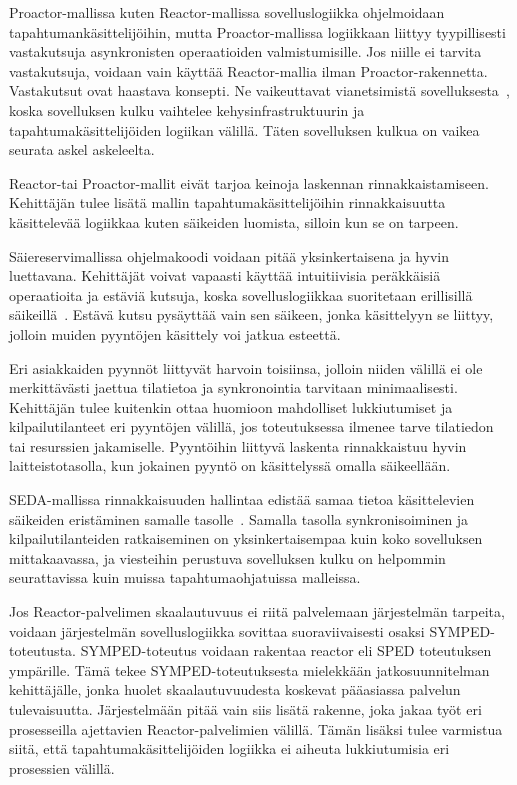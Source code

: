 \documentclass[finnish]{tktltiki2}%
\theoremstyle{definition}
\theoremstyle{remark}
\begin{document}
Proactor-mallissa kuten Reactor-mallissa sovelluslogiikka ohjelmoidaan
tapahtumankäsittelijöihin, mutta Proactor-mallissa logiikkaan liittyy
tyypillisesti vastakutsuja 
asynkronisten operaatioiden valmistumisille. Jos 
niille ei tarvita vastakutsuja,
voidaan vain käyttää Reactor-mallia ilman Proactor-rakennetta.
Vastakutsut ovat haastava konsepti. Ne vaikeuttavat vianetsimistä
sovelluksesta~\cite{hu_applying_1998}, koska sovelluksen kulku vaihtelee kehysinfrastruktuurin
ja tapahtumakäsittelijöiden logiikan välillä. Täten sovelluksen
kulkua on vaikea seurata askel askeleelta.

Reactor-tai Proactor-mallit eivät tarjoa keinoja
laskennan rinnakkaistamiseen. Kehittäjän tulee lisätä
mallin tapahtumakäsittelijöihin rinnakkaisuutta käsittelevää
logiikkaa kuten säikeiden luomista, silloin kun se on tarpeen.

Säiereservimallissa ohjelmakoodi voidaan pitää yksinkertaisena ja
hyvin luettavana. Kehittäjät voivat vapaasti käyttää intuitiivisia
peräkkäisiä operaatioita ja estäviä kutsuja, koska sovelluslogiikkaa
suoritetaan erillisillä säikeillä~\cite{hu_applying_1998}. Estävä kutsu pysäyttää vain
sen säikeen, jonka käsittelyyn se liittyy, jolloin muiden
pyyntöjen käsittely voi jatkua esteettä.

Eri asiakkaiden pyynnöt liittyvät harvoin toisiinsa,
jolloin niiden välillä ei ole merkittävästi jaettua tilatietoa ja
synkronointia tarvitaan minimaalisesti.
Kehittäjän tulee kuitenkin ottaa huomioon mahdolliset lukkiutumiset
ja kilpailutilanteet eri pyyntöjen välillä, jos
toteutuksessa ilmenee tarve tilatiedon tai resurssien jakamiselle.
Pyyntöihin liittyvä laskenta rinnakkaistuu hyvin laitteistotasolla,
kun jokainen pyyntö on käsittelyssä omalla säikeellään.

SEDA-mallissa rinnakkaisuuden hallintaa edistää
samaa tietoa käsittelevien säikeiden eristäminen samalle tasolle~\cite{welsh_seda_2001}.
Samalla tasolla synkronisoiminen ja kilpailutilanteiden ratkaiseminen on
yksinkertaisempaa kuin koko sovelluksen mittakaavassa, ja
viesteihin perustuva sovelluksen kulku on helpommin seurattavissa kuin
muissa tapahtumaohjatuissa malleissa.

Jos Reactor-palvelimen skaalautuvuus ei riitä palvelemaan
järjestelmän tarpeita, voidaan järjestelmän sovelluslogiikka
sovittaa suoraviivaisesti osaksi SYMPED-toteutusta. SYMPED-toteutus
voidaan rakentaa reactor eli SPED toteutuksen ympärille. Tämä
tekee SYMPED-toteutuksesta mielekkään jatkosuunnitelman kehittäjälle,
jonka huolet skaalautuvuudesta koskevat pääasiassa palvelun tulevaisuutta.
Järjestelmään pitää vain siis lisätä rakenne, joka
jakaa työt eri prosesseilla ajettavien Reactor-palvelimien välillä.
Tämän lisäksi tulee varmistua siitä, että tapahtumakäsittelijöiden
logiikka ei aiheuta lukkiutumisia eri prosessien välillä.
\end{document}

